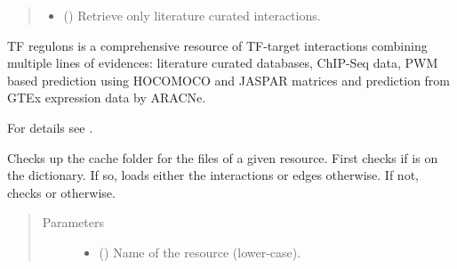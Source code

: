 \documentclass[letterpaper,10pt,english]{sphinxmanual}
\begin{document}
\begin{fulllineitems}
\begin{fulllineitems}
\begin{quote}
\begin{description}
\begin{itemize}
\item {} 
 () \textendash{} Retrieve only literature curated interactions.

\end{itemize}

\end{description}\end{quote}

TF regulons is a comprehensive resource of TF-target interactions
combining multiple lines of evidences: literature curated databases,
ChIP-Seq data, PWM based prediction using HOCOMOCO and JASPAR matrices
and prediction from GTEx expression data by ARACNe.

For details see .

%
\begin{sphinxVerbatim}[commandchars=\\\{\}]
 
  
  
\end{sphinxVerbatim}

\end{fulllineitems}


\begin{fulllineitems}
\label{\detokenize{main:pypath.main.PyPath.lookup_cache}}
Checks up the cache folder for the files of a given resource.
First checks if  is on the  dictionary.
If so, loads either the interactions or edges otherwise. If
not, checks  or  otherwise.
\begin{quote}\begin{description}
\item[{Parameters}] \leavevmode\begin{itemize}
\item {} 
 () \textendash{} Name of the resource (lower-case).


\end{itemize}
\end{description}
\end{quote}
\end{fulllineitems}
\end{fulllineitems}
\end{document}
